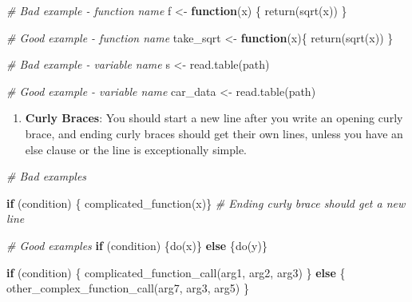 \documentclass[
]{book}
\newenvironment{Shaded}{\begin{snugshade}}{\end{snugshade}}
\newcommand{\CommentTok}[1]{\textcolor[rgb]{0.56,0.35,0.01}{\textit{#1}}}
\newcommand{\ControlFlowTok}[1]{\textcolor[rgb]{0.13,0.29,0.53}{\textbf{#1}}}
\newcommand{\FunctionTok}[1]{\textcolor[rgb]{0.00,0.00,0.00}{#1}}
\newcommand{\NormalTok}[1]{#1}
\newcommand{\OtherTok}[1]{\textcolor[rgb]{0.56,0.35,0.01}{#1}}
\providecommand{\tightlist}{%
  \setlength{\itemsep}{0pt}\setlength{\parskip}{0pt}}
\begin{document}
\begin{Shaded}
\begin{Highlighting}[]
\CommentTok{\# Bad example {-} function name}
\NormalTok{f }\OtherTok{\textless{}{-}} \ControlFlowTok{function}\NormalTok{(x) \{}
  \FunctionTok{return}\NormalTok{(}\FunctionTok{sqrt}\NormalTok{(x))}
\NormalTok{\}}

\CommentTok{\# Good example {-} function name}
\NormalTok{take\_sqrt }\OtherTok{\textless{}{-}} \ControlFlowTok{function}\NormalTok{(x)\{}
  \FunctionTok{return}\NormalTok{(}\FunctionTok{sqrt}\NormalTok{(x))}
\NormalTok{\}}

\CommentTok{\# Bad example {-} variable name}
\NormalTok{s }\OtherTok{\textless{}{-}} \FunctionTok{read.table}\NormalTok{(path)}

\CommentTok{\# Good example {-} variable name}
\NormalTok{car\_data }\OtherTok{\textless{}{-}} \FunctionTok{read.table}\NormalTok{(path)}
\end{Highlighting}
\end{Shaded}

\begin{enumerate}
\def\labelenumi{\arabic{enumi}.}
\setcounter{enumi}{2}
\tightlist
\item
  \textbf{Curly Braces}: You should start a new line after you write an opening curly brace, and ending curly braces should get their own lines, unless you have an else clause or the line is exceptionally simple.
\end{enumerate}

\begin{Shaded}
\begin{Highlighting}[]
\CommentTok{\# Bad examples}

\ControlFlowTok{if}\NormalTok{ (condition) \{}
  \FunctionTok{complicated\_function}\NormalTok{(x)\} }\CommentTok{\# Ending curly brace should get a new line}

\CommentTok{\# Good examples}
\ControlFlowTok{if}\NormalTok{ (condition) \{}\FunctionTok{do}\NormalTok{(x)\} }\ControlFlowTok{else}\NormalTok{ \{}\FunctionTok{do}\NormalTok{(y)\}}

\ControlFlowTok{if}\NormalTok{ (condition) \{}
  \FunctionTok{complicated\_function\_call}\NormalTok{(arg1, arg2, arg3)}
\NormalTok{\} }\ControlFlowTok{else}\NormalTok{ \{}
  \FunctionTok{other\_complex\_function\_call}\NormalTok{(arg7, arg3, arg5)}
\NormalTok{\}}
\end{Highlighting}
\end{Shaded}
\end{document}
